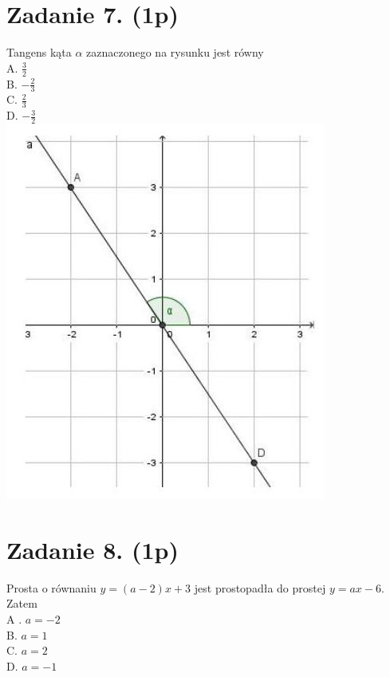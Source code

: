 \documentclass[10pt]{article}
\begin{document}
\section*{Zadanie 7. (1p)}
Tangens kąta \(\alpha\) zaznaczonego na rysunku jest równy\\
A. \(\frac{3}{2}\)\\
B. \(-\frac{2}{3}\)\\
C. \(\frac{2}{3}\)\\
D. \(-\frac{3}{2}\)\\
\includegraphics[max width=\textwidth, center]{2024_11_21_0213a2175f3206eefc55g-02}

\section*{Zadanie 8. (1p)}
Prosta o równaniu \(y=(a-2) x+3\) jest prostopadła do prostej \(y=a x-6\). Zatem\\
A . \(a=-2\)\\
B. \(a=1\)\\
C. \(a=2\)\\
D. \(a=-1\)
\end{document}
